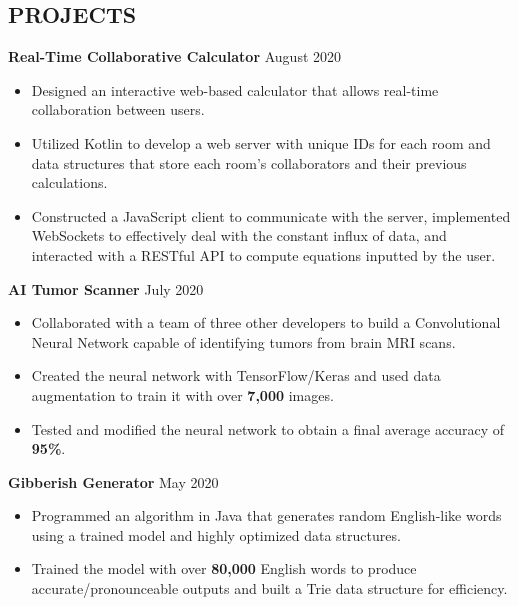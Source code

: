 \documentclass[11pt]{res}
\begin{document}
\begin{footnotesize}
\begin{resume}
\section{PROJECTS} 
\textbf{Real-Time Collaborative Calculator} \hfill August 2020\vspace{-5.25mm}
\begin{itemize} \itemsep -2pt 
\item Designed an interactive web-based calculator that allows real-time collaboration between users. 
\vspace{.75mm}
\item Utilized Kotlin to develop a web server with unique IDs for each room and data structures that store each room's collaborators and their previous calculations.
\vspace{.75mm}
\item Constructed a JavaScript client to communicate with the server, implemented WebSockets to effectively deal with the constant influx of data, and interacted with a RESTful API to compute equations inputted by the user.  
\end{itemize}
\vspace{-2.5mm}
\textbf{AI Tumor Scanner}  \hfill July 2020\vspace{-5.25mm}
\begin{itemize} \itemsep -2pt 
\item Collaborated with a team of three other developers to build a Convolutional Neural Network capable of identifying tumors from brain MRI scans. 
\vspace{.75mm}
\item Created the neural network with TensorFlow/Keras and used data augmentation to train it with over \textbf{7,000} images.
\vspace{.75mm}
\item Tested and modified the neural network to obtain a final average accuracy of \textbf{95\%}.
\end{itemize}
\vspace{-2.5mm}
\textbf{Gibberish Generator} \hfill May 2020\vspace{-5.25mm}
\begin{itemize} \itemsep -2pt 
\item Programmed an algorithm in Java that generates random English-like words using a trained model and highly optimized data structures.  
\vspace{.75mm}
\item Trained the model with over \textbf{80,000} English words to produce accurate/pronounceable outputs and built a Trie data structure for efficiency.

\end{itemize}
\end{resume}
\end{footnotesize}
\end{document}
